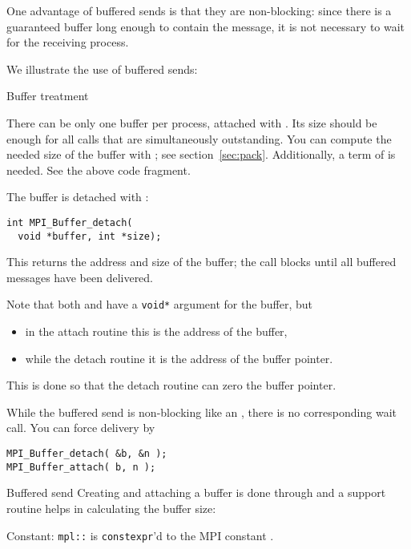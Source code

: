 One advantage of buffered sends is that they are non-blocking:
since there is a guaranteed buffer long enough to contain the
message, it is not necessary to wait for the receiving process.

We illustrate the use of buffered sends:


 {Buffer treatment}

There can be only one buffer per process, attached with
.
Its size should be enough
for all  calls that are simultaneously
outstanding.
You can compute the needed size of the buffer with ;
see section~\ref{sec:pack}.
Additionally, a term of  is needed.
See the above code fragment.

The buffer is detached with :
\begin{lstlisting}
int MPI_Buffer_detach(
  void *buffer, int *size);
\end{lstlisting}
This returns the address and size of the buffer; the call blocks
until all buffered messages have been delivered.

Note that both
 and 
have a \lstinline+void*+ argument for the buffer, but 
\begin{itemize}
\item in the attach routine this is the address of the buffer,
\item while the detach routine it is the address of the buffer pointer.
\end{itemize}
This is done so that the detach routine can zero the buffer pointer.

While the buffered send is non-blocking like an ,
there is no corresponding wait call.
You can force delivery by
\begin{lstlisting}
MPI_Buffer_detach( &b, &n );
MPI_Buffer_attach( b, n );
\end{lstlisting}

\begin{mplnote}{Buffered send}
  Creating and attaching a buffer is done through 
  and a support routine  helps in calculating
  the buffer size:

  Constant: \lstinline+mpl::+ is \lstinline{constexpr}'d
  to the MPI constant .
\end{mplnote}

